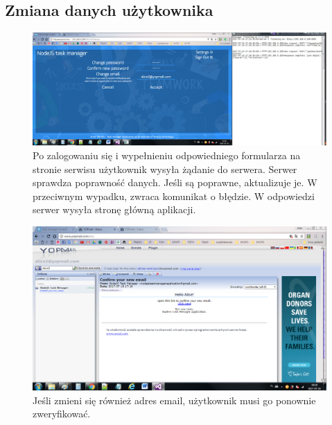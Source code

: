 \documentclass[12pt]{report}
\begin{document}
\subsection{Zmiana danych użytkownika}
\begin{figure}[!hb]
\centering
\includegraphics[width=\textwidth,height=\textheight,keepaspectratio]{62.png}
\captionsetup{labelformat=empty}
\caption[]{Po zalogowaniu się i wypełnieniu odpowiedniego formularza na stronie serwisu użytkownik wysyła żądanie do serwera. 
Serwer sprawdza poprawność danych. Jeśli są poprawne, aktualizuje je.
W przeciwnym wypadku, zwraca komunikat o błędzie. 
W odpowiedzi serwer wysyła stronę główną aplikacji.}
\end{figure}
\begin{figure}[!hb]
\centering
\includegraphics[width=\textwidth,height=\textheight,keepaspectratio]{63.png}
\captionsetup{labelformat=empty}
\caption[]{Jeśli zmieni się również adres email, użytkownik musi go ponownie zweryfikować. }
\end{figure}

\newpage 
\end{document}

